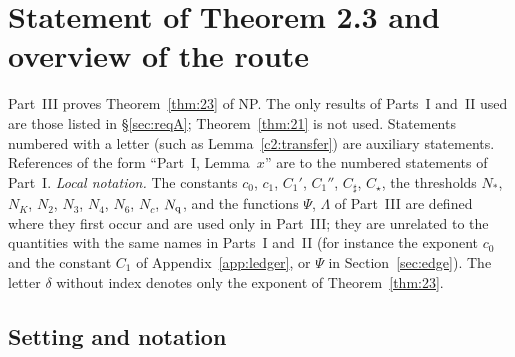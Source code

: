\section{Statement of Theorem 2.3 and overview of the route}\label{sec:C1}

Part~III proves Theorem~\ref{thm:23} of NP. The only results of Parts~I and~II used are those listed in \S\ref{sec:reqA}; Theorem~\ref{thm:21} is not used.
Statements numbered with a letter (such as Lemma~\ref{c2:transfer}) are auxiliary statements.
References of the form ``Part~I, Lemma~$x$'' are to the numbered statements of Part~I.
\emph{Local notation.} The constants $c_0$, $c_1$, $C_1'$, $C_1''$, $C_\sharp$, $C_\star$, the thresholds $N_*$, $N_K$, $N_2$, $N_3$, $N_4$, $N_6$, $N_c$, $N_{\rm q}$, and the functions $\Psi$, $\Lambda$ of Part~III are defined
where they first occur and are used only in Part~III; they are unrelated to the quantities with the same names in Parts~I and~II (for instance the exponent $c_0$ and the
constant $C_1$ of Appendix~\ref{app:ledger}, or $\Psi$ in Section~\ref{sec:edge}). The letter $\delta$ without index denotes only the exponent of Theorem~\ref{thm:23}.

\subsection{Setting and notation}\label{ss:notation}

